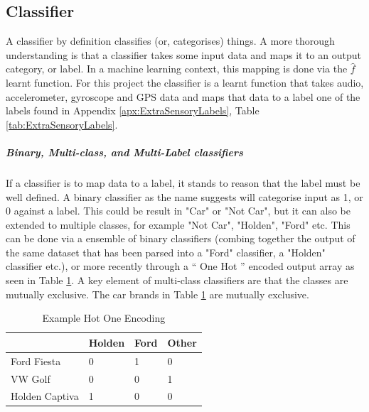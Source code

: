 \documentclass{UoNMCHA}
\newcommand{\inlineQuote}[1]{`` #1 ''}
\newcommand{\tref}[1] {Table \ref{#1}}
\newcommand{\aref}[1] {Appendix \ref{#1}}
\numberwithin{equation}{section}
\begin{document}




\subsection{Classifier}

A classifier by definition classifies (or, categorises) things. A more thorough understanding is that a classifier takes some input data and maps it to an output category, or label. In a machine learning context, this mapping is done via the $\hat{f}$ learnt function. For this project the classifier is a learnt function that takes audio, accelerometer, gyroscope and GPS data and maps that data to a label one of the labels found in \aref{apx:ExtraSensoryLabels}, \tref{tab:ExtraSensoryLabels}. 

\subparagraph{Binary, Multi-class, and  Multi-Label classifiers}
If a classifier is to map data to a label, it stands to reason that the label must be well defined. A binary classifier as the name suggests will categorise input as 1, or 0 against a label. This could be result in "Car" or "Not Car", but it can also be extended to multiple classes, for example "Not Car", "Holden", "Ford" etc. This can be done via a ensemble of binary classifiers (combing together the output of the same dataset that has been parsed into a "Ford" classifier, a "Holden" classifier etc.), or more recently through a \inlineQuote{One Hot} \cite{huffman1954the} encoded output array as seen in \tref{tab:HotOneEnc}. A key element of multi-class classifiers are that the classes are mutually exclusive. The car brands in \tref{tab:HotOneEnc} are mutually exclusive.

\begin{table}[h]
    \begin{center}  
    \caption{Example Hot One Encoding}\label{tab:HotOneEnc}
        \begin{tabular}{llll}
            \hline\hline
                           & Holden & Ford & Other \\\hline
                            
            Ford Fiesta    & 0      & 1    & 0     \\
            VW Golf        & 0      & 0    & 1     \\
            Holden Captiva & 1      & 0    & 0     \\
            \hline
        \end{tabular}
    \end{center}
\end{table}
\end{document}
